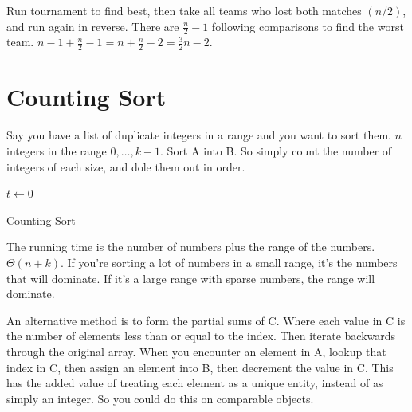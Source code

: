 \documentclass[english, 10pt]{article}
\begin{document}
Run tournament to find best, then take all teams who lost both matches $(n/2)$,
and run again in reverse. There are $\frac{n}{2}-1$ following comparisons to
find the worst team. $n-1+\frac{n}{2}-1 = n+\frac{n}{2}-2 = \frac{3}{2}n -2$.



\section{Counting Sort}

Say you have a list of duplicate integers in a range and you want to sort them.
$n$ integers in the range $0,\ldots,k-1$. Sort A into B. So simply count the number of integers of each size, and dole them out in order.

\begin{algorithm}
    $t\gets 0$\;
    \caption{Counting Sort}
\end{algorithm}

The running time is the number of numbers plus the range of the numbers.
$\Theta(n+k)$.  If you're sorting a lot of numbers in a small range, it's the
numbers that will dominate. If it's a large range with sparse numbers, the
range will dominate.

An alternative method is to form the partial sums of C. Where each value in C
is the number of elements less than or equal to the index. Then iterate
backwards through the original array. When you encounter an element in A,
lookup that index in C, then assign an element into B, then decrement the value
in C. This has the added value of treating each element as a unique entity,
instead of as simply an integer. So you could do this on comparable objects.
\end{document}
